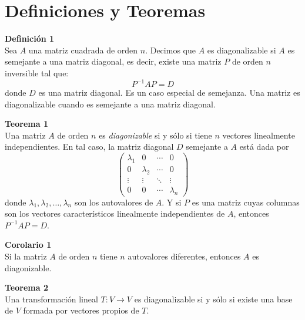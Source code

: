 \documentclass{article}
\newenvironment{definition}[2][Definición]
    { \begin{mdframed}[backgroundcolor=red!20] \textbf{#1 #2} \\}
    {  \end{mdframed}}
\newenvironment{theorem}[2][Teorema]
    { \begin{mdframed}[backgroundcolor=green!20] \textbf{#1 #2} \\}
    {  \end{mdframed}}
\newenvironment{corollary}[2][Corolario]
    { \begin{mdframed}[backgroundcolor=green!20] \textbf{#1 #2} \\}
    {  \end{mdframed}}
\begin{document}
\section*{Definiciones y Teoremas}

\begin{definition}{1}
Sea $A$ una matriz cuadrada de orden $n$. Decimos que $A$ es diagonalizable si $A$ es semejante a una matriz diagonal, es decir, existe una matriz $P$ de orden $n$ inversible tal que:
$$
P^{-1}AP = D
$$
donde $D$ es una matriz diagonal.
Es un caso especial de semejanza. Una matriz es diagonalizable cuando es semejante a una matriz diagonal.
\end{definition}

\begin{theorem}{1}
    Una matriz $A$ de orden $n$ es \textit{diagonizable} si y sólo si tiene $n$ vectores linealmente independientes. En tal caso, la matriz diagonal $D$ semejante a $A$ está dada por
    $$
    \begin{pmatrix}
    \lambda_1 & 0 & \cdots & 0 \\
    0 & \lambda_2 & \cdots & 0 \\
    \vdots & \vdots & \ddots & \vdots \\
    0 & 0 & \cdots & \lambda_n
    \end{pmatrix}
    $$
    donde $\lambda_1, \lambda_2, \ldots, \lambda_n$ son los autovalores de $A$. Y si $P$ es una matriz cuyas columnas son los vectores característicos linealmente independientes de $A$, entonces $P^{-1}AP = D$.
\end{theorem}

\begin{corollary}{1}
    Si la matriz $A$ de orden $n$ tiene $n$ autovalores diferentes, entonces $A$ es diagonizable.
\end{corollary}

\begin{theorem}{2}
    Una transformación lineal $T:V \to V$ es diagonalizable si y sólo si existe una base de $V$ formada por vectores propios de $T$.
\end{theorem}

\end{document}

